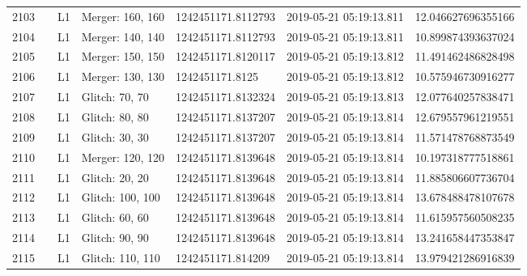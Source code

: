\begin{longtable}{lllllll}
2103 &                                                    &       L1 &  Merger: 160, 160 &  1242451171.8112793 &  2019-05-21 05:19:13.811 &  12.046627696355166 \\
2104 &                                                    &       L1 &  Merger: 140, 140 &  1242451171.8112793 &  2019-05-21 05:19:13.811 &  10.899874393637024 \\
2105 &                                                    &       L1 &  Merger: 150, 150 &  1242451171.8120117 &  2019-05-21 05:19:13.812 &  11.491462486828498 \\
2106 &                                                    &       L1 &  Merger: 130, 130 &     1242451171.8125 &  2019-05-21 05:19:13.812 &  10.575946730916277 \\
2107 &                                                    &       L1 &    Glitch: 70, 70 &  1242451171.8132324 &  2019-05-21 05:19:13.813 &  12.077640257838471 \\
2108 &                                                    &       L1 &    Glitch: 80, 80 &  1242451171.8137207 &  2019-05-21 05:19:13.814 &  12.679557961219551 \\
2109 &                                                    &       L1 &    Glitch: 30, 30 &  1242451171.8137207 &  2019-05-21 05:19:13.814 &  11.571478768873549 \\
2110 &                                                    &       L1 &  Merger: 120, 120 &  1242451171.8139648 &  2019-05-21 05:19:13.814 &  10.197318777518861 \\
2111 &                                                    &       L1 &    Glitch: 20, 20 &  1242451171.8139648 &  2019-05-21 05:19:13.814 &  11.885806607736704 \\
2112 &                                                    &       L1 &  Glitch: 100, 100 &  1242451171.8139648 &  2019-05-21 05:19:13.814 &  13.678488478107678 \\
2113 &                                                    &       L1 &    Glitch: 60, 60 &  1242451171.8139648 &  2019-05-21 05:19:13.814 &  11.615957560508235 \\
2114 &                                                    &       L1 &    Glitch: 90, 90 &  1242451171.8139648 &  2019-05-21 05:19:13.814 &  13.241658447353847 \\
2115 &                                                    &       L1 &  Glitch: 110, 110 &   1242451171.814209 &  2019-05-21 05:19:13.814 &  13.979421286916839 \\

\end{longtable}
